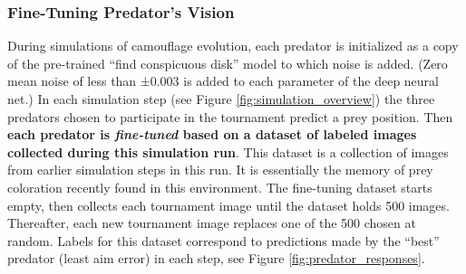 \documentclass[letterpaper]{article}
\newcommand{\jargon}[1]{\textit{#1}}
\begin{document}
\subsubsection{Fine-Tuning Predator's Vision}
During simulations of camouflage evolution, each predator is initialized as a copy of the pre-trained “find conspicuous disk” model to which noise is added. (Zero mean noise of less than ±0.003 is added to each parameter of the deep neural net.) In each simulation step (see Figure \ref{fig:simulation_overview}) the three predators chosen to participate in the tournament predict a prey position. Then \textbf{each predator is \jargon{fine-tuned} based on a dataset of labeled images collected during this simulation run}. This dataset is a collection of images from earlier simulation steps in this run. It is essentially the memory of prey coloration recently found in this environment. The fine-tuning dataset starts empty, then collects each tournament image until the dataset holds 500 images. Thereafter, each new tournament image replaces one of the 500 chosen at random. Labels for this dataset correspond to predictions made by the “best” predator (least aim error) in each step, see Figure \ref{fig:predator_responses}.
\par

\end{document}
